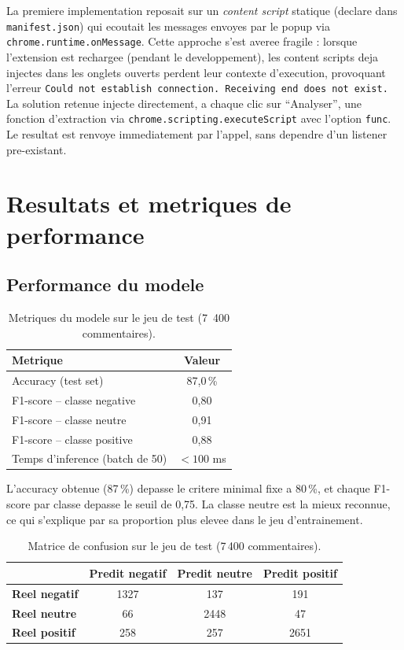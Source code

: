 \documentclass[11pt,a4paper]{article}
\begin{document}
La premiere implementation reposait sur un \emph{content script} statique (declare dans \texttt{manifest.json}) qui ecoutait les messages envoyes par le popup via \texttt{chrome.runtime.onMessage}. Cette approche s'est averee fragile : lorsque l'extension est rechargee (pendant le developpement), les content scripts deja injectes dans les onglets ouverts perdent leur contexte d'execution, provoquant l'erreur \texttt{Could not establish connection. Receiving end does not exist.} La solution retenue injecte directement, a chaque clic sur ``Analyser'', une fonction d'extraction via \texttt{chrome.scripting.executeScript} avec l'option \texttt{func}. Le resultat est renvoye immediatement par l'appel, sans dependre d'un listener pre-existant.

\section{Resultats et metriques de performance}

\subsection{Performance du modele}

\begin{table}[h]
\centering
\begin{tabular}{@{}lc@{}}
\toprule
\textbf{Metrique} & \textbf{Valeur} \\
\midrule
Accuracy (test set) & 87,0\,\% \\
F1-score -- classe negative & 0,80 \\
F1-score -- classe neutre & 0,91 \\
F1-score -- classe positive & 0,88 \\
Temps d'inference (batch de 50) & $< 100$ ms \\
\bottomrule
\end{tabular}
\caption{Metriques du modele sur le jeu de test (7~400 commentaires).}
\end{table}

L'accuracy obtenue (87\,\%) depasse le critere minimal fixe a 80\,\%, et chaque F1-score par classe depasse le seuil de 0,75. La classe neutre est la mieux reconnue, ce qui s'explique par sa proportion plus elevee dans le jeu d'entrainement.

\begin{table}[h]
\centering
\begin{tabular}{@{}l ccc@{}}
\toprule
 & \textbf{Predit negatif} & \textbf{Predit neutre} & \textbf{Predit positif} \\
\midrule
\textbf{Reel negatif} & 1327 & 137 & 191 \\
\textbf{Reel neutre} & 66 & 2448 & 47 \\
\textbf{Reel positif} & 258 & 257 & 2651 \\
\bottomrule
\end{tabular}
\caption{Matrice de confusion sur le jeu de test (7\,400 commentaires).}
\label{tab:confusion}
\end{table}
\end{document}
